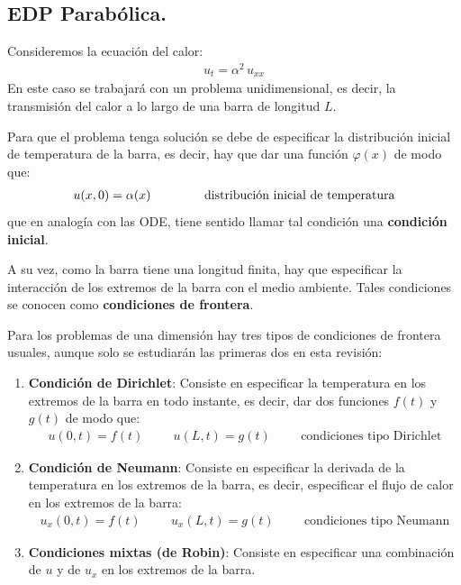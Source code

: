 \documentclass[12pt]{article}
\numberwithin{equation}{section}
\begin{document}
\subsection{EDP Parabólica.}
Consideremos la ecuación del calor:
\begin{align*}
u_{t} =  \alpha^{2} \,  u_{xx}
\end{align*}
En este caso se trabajará con un problema unidimensional, es decir, la transmisión del calor a lo largo de una barra de longitud $L$.
\par
Para que el problema tenga solución se debe de especificar la distribución inicial de temperatura de la barra, es decir, hay que dar una función $\varphi (x)$ de modo que:
\begin{align}
u (x, 0) = \alpha (x) \hspace{1.5cm} \mbox{distribución inicial de temperatura}
\label{eq:ecuacion_06_02_02}
\end{align}
que en analogía con las ODE, tiene sentido llamar tal condición una \textbf{condición inicial}.
\par
A su vez, como la barra tiene una longitud finita, hay que especificar la interacción de los extremos de la barra con el medio ambiente. Tales condiciones se conocen como \textbf{condiciones de frontera}.
\par
Para los problemas de una dimensión hay tres tipos de condiciones de frontera usuales, aunque solo se estudiarán las primeras dos en esta revisión:
\begin{enumerate}
\item \textbf{Condición de Dirichlet}: Consiste en especificar la temperatura en los extremos de la barra en todo instante, es decir, dar dos funciones $f(t)$ y $g(t)$ de modo que:
\begin{align}
u (0, t) = f (t)  \hspace{1cm} u(L, t) = g(t) \hspace{1cm} \mbox{condiciones tipo Dirichlet}
\label{eq:ecuacion_06_02_03}    
\end{align}
\item \textbf{Condición de Neumann}: Consiste en especificar la derivada de la temperatura en los extremos de la barra, es decir, especificar el flujo de calor en los extremos de la barra:
\begin{align}
u_{x} (0,t) = f(t) \hspace{1cm} u_{x}(L,t) = g(t) \hspace{1cm} \mbox{condiciones tipo Neumann}
\label{eq:ecuacion_06_02_04}    
\end{align}
\item \textbf{Condiciones mixtas (de Robin)}: Consiste en especificar una combinación de $u$ y de $u_{x}$ en los extremos de la barra.
\end{enumerate}
\end{document}
